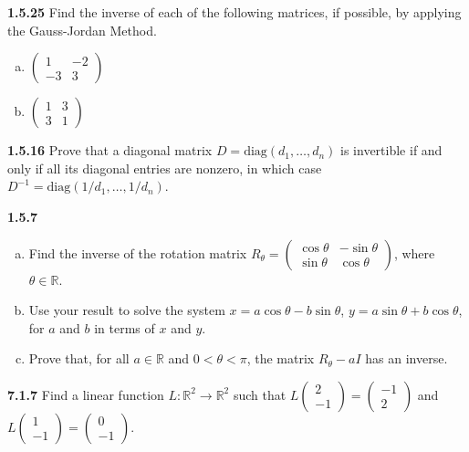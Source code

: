 \documentclass{article}
\begin{document}
\textbf{1.5.25} Find the inverse of each of the following matrices, if possible, by applying the Gauss-Jordan Method.
\begin{enumerate}[(a)]
    \item \(\begin{pmatrix} 1 & -2 \\ -3 & 3 \end{pmatrix}\)
    \item \(\begin{pmatrix} 1 & 3 \\ 3 & 1 \end{pmatrix}\)
\end{enumerate}
\vspace{10pt}

\textbf{1.5.16} Prove that a diagonal matrix \(D = \text{diag}(d_1, \ldots, d_n)\) is invertible if and only if all its diagonal entries are nonzero, in which case \(D^{-1} = \text{diag}(1/d_1, \ldots, 1/d_n)\).
\vspace{10pt}

\textbf{1.5.7}
\begin{enumerate}[(a)]
    \item Find the inverse of the rotation matrix \(R_\theta = \begin{pmatrix} \cos \theta & -\sin \theta \\ \sin \theta & \cos \theta \end{pmatrix}\), where \(\theta \in \mathbb{R}\).
    \item Use your result to solve the system \(x = a \cos \theta - b \sin \theta\), \(y = a \sin \theta + b \cos \theta\), for \(a\) and \(b\) in terms of \(x\) and \(y\).
    \item Prove that, for all \(a \in \mathbb{R}\) and \(0 < \theta < \pi\), the matrix \(R_\theta - aI\) has an inverse.
\end{enumerate}
\vspace{10pt}

\textbf{7.1.7} Find a linear function \(L: \mathbb{R}^2 \to \mathbb{R}^2\) such that \(L\begin{pmatrix} 2 \\ -1 \end{pmatrix} = \begin{pmatrix} -1 \\ 2 \end{pmatrix}\) and \(L\begin{pmatrix} 1 \\ -1 \end{pmatrix} = \begin{pmatrix} 0 \\ -1 \end{pmatrix}\).
\vspace{10pt}
\end{document}
